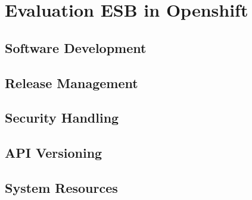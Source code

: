 \chapter{Evaluation ESB in Openshift}
\label{cha:eval}

\section{Software Development}
\label{sec:eval-software-dev}

\section{Release Management}
\label{sec:eval-releases}

\section{Security Handling}
\label{sec:eval-security}

\section{API Versioning}
\label{sec:eval-errors}

\section{System Resources}
\label{sec:eval-resources}